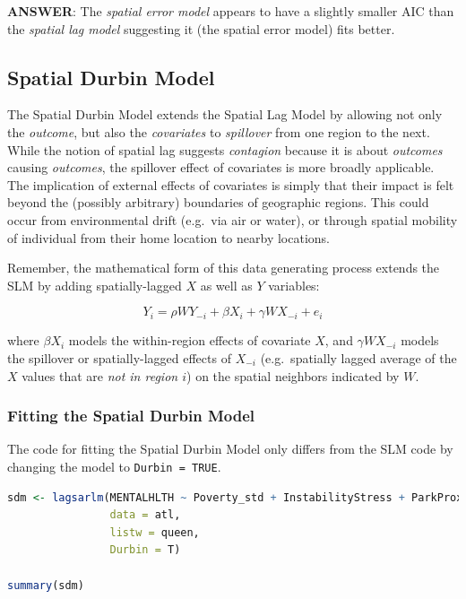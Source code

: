 \documentclass[
]{book}
\newcommand{\passthrough}[1]{#1}
\begin{document}
\textbf{ANSWER}: The \emph{spatial error model} appears to have a slightly smaller AIC than the \emph{spatial lag model} suggesting it (the spatial error model) fits better.

\hypertarget{spatial-durbin-model-1}{%
\subsection{Spatial Durbin Model}\label{spatial-durbin-model-1}}

The Spatial Durbin Model extends the Spatial Lag Model by allowing not only the \emph{outcome}, but also the \emph{covariates} to \emph{spillover} from one region to the next. While the notion of spatial lag suggests \emph{contagion} because it is about \emph{outcomes} causing \emph{outcomes}, the spillover effect of covariates is more broadly applicable. The implication of external effects of covariates is simply that their impact is felt beyond the (possibly arbitrary) boundaries of geographic regions. This could occur from environmental drift (e.g.~via air or water), or through spatial mobility of individual from their home location to nearby locations.

Remember, the mathematical form of this data generating process extends the SLM by adding spatially-lagged \(X\) as well as \(Y\) variables:

\[Y_i=\rho WY_{-i}+\beta X_i + \gamma WX_{-i} + e_i\]

where \(\beta X_i\) models the within-region effects of covariate \(X\), and \(\gamma WX_{-i}\) models the spillover or spatially-lagged effects of \(X_{-i}\) (e.g.~spatially lagged average of the \(X\) values that are \emph{not in region \(i\)}) on the spatial neighbors indicated by \(W\).

\hypertarget{fitting-the-spatial-durbin-model}{%
\subsubsection{Fitting the Spatial Durbin Model}\label{fitting-the-spatial-durbin-model}}

The code for fitting the Spatial Durbin Model only differs from the SLM code by changing the model to \passthrough{\lstinline!Durbin = TRUE!}.

\begin{lstlisting}[language=R]
sdm <- lagsarlm(MENTALHLTH ~ Poverty_std + InstabilityStress + ParkProximity_std  + PHYSHLTH,
                data = atl,
                listw = queen,
                Durbin = T)

summary(sdm)
\end{lstlisting}
\end{document}
